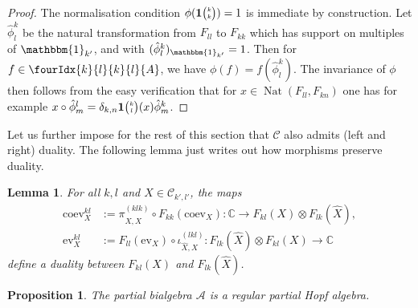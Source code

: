 \documentclass[10pt]{article}
\DeclareMathOperator{\Nat}{\mathrm{Nat}}
\newcommand{\C}{\mathbb{C}}
\newcommand{\CatCC}{\mathscr{C}}
\newcommand{\ev}{\mathrm{ev}}
\newcommand{\coev}{\mathrm{coev}}
\newcommand{\Grt}[3]{#1{\tiny {\begin{pmatrix} #2\\#3\end{pmatrix}}}}
\newcommand{\Unitb}{\mathbbm{1}}
\newcommand{\UnitC}[2]{\Grt{\mathbf{1}}{#1}{#2}}
\newcommand{\Gr}[5]{\fourIdx{#2}{#4}{#3}{#5}{#1}}%
\newtheorem{Lem}[Theorem]{Lemma}
\newtheorem{Prop}[Theorem]{Proposition}
\theoremstyle{definition}
\numberwithin{equation}{section}
\begin{document}
\begin{proof} The normalisation condition $\phi(\UnitC{k}{k})=1$ is immediate by construction. Let $\hat{\phi}^k_l$ be the natural transformation from $F_{ll}$ to $F_{kk}$ which has support on multiples of $\Unitb_{k'}$, and with $(\hat{\phi}^k_l)_{\Unitb_{k'}} = 1$.  Then for $f\in \Gr{A}{k}{k}{l}{l}$, we have $\phi(f) = f(\hat{\phi}^k_l)$. The invariance of $\phi$ then follows from the easy verification that for $x\in \Nat(F_{ll},F_{kn})$ one has for example $x\circ \hat{\phi}^l_m =\delta_{k,n} \UnitC{k}{l}(x)\hat{\phi}^k_m$. 
\end{proof}

Let us further impose for the rest of this section that $\CatCC$ also admits (left and right) duality.  The following lemma just writes out how morphisms preserve duality.
\begin{Lem}
  For all $k,l$ and $X\in \mathcal{C}_{k',l'}$,  the maps
  \begin{align*}
    \coev^{kl}_{X}  &:=  \pi^{(klk)}_{X,\hat X} \circ F_{kk}(\coev_{X})\colon \C \to F_{kl}(X)
    \otimes F_{lk}(\hat X), \\
    \ev^{kl}_{X} &:=  F_{ll}(\ev_{X}) \circ \iota^{(lkl)}_{\hat X,X} \colon
    F_{lk}(\hat X) \otimes F_{kl}(X) \to \C
  \end{align*}
  define a duality between $F_{kl}(X)$ and $F_{lk}(\hat X)$.
\end{Lem}


\begin{Prop}\label{PropAnti} The partial bialgebra $\mathscr{A}$ is a regular partial Hopf algebra.
\end{Prop} 
\end{document}
